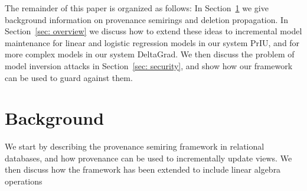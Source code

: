 \documentclass[11pt]{article}
\newcommand{\priu}{PrIU}
\newcommand{\deltagrad}{DeltaGrad}
\begin{document}

The remainder of this paper is organized as follows:  In Section~\ref{sec: background} we give background information on provenance semirings and deletion propagation.  In Section~\ref{sec: overview} we discuss how to extend these ideas to incremental model maintenance for linear and logistic regression models in our system \priu, and for more complex models in our system \deltagrad.  We then discuss the problem of model inversion attacks in Section~\ref{sec: security}, and show how our framework can be used to guard against them.

\section{Background}
\label{sec: background}

We start by describing the provenance semiring framework in relational databases, and how provenance can be used to incrementally update views.  We then discuss how the framework has been extended to include linear algebra operations
\end{document}
